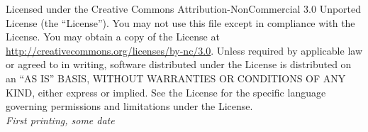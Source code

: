 \documentclass[11pt, %
               oneside] %
               {book}
\begin{document}
\noindent Licensed under the Creative Commons Attribution-NonCommercial 3.0 Unported License (the ``License''). You may not use this file except in compliance with the License. You may obtain a copy of the License at \url{http://creativecommons.org/licenses/by-nc/3.0}. Unless required by applicable law or agreed to in writing, software distributed under the License is distributed on an \textsc{``AS IS'' BASIS, WITHOUT WARRANTIES OR CONDITIONS OF ANY KIND}, either express or implied. See the License for the specific language governing permissions and limitations under the License.\\ %

\noindent \textit{First printing, some date} %
\fi

\end{document}
